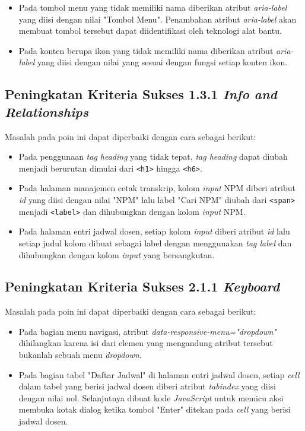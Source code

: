 \begin{itemize}
    \item Pada tombol menu yang tidak memiliki nama diberikan atribut \textit{aria-label} yang diisi dengan nilai "Tombol Menu". Penambahan atribut \textit{aria-label} akan membuat tombol tersebut dapat diidentifikasi oleh teknologi alat bantu.
    \item Pada konten berupa ikon yang tidak memiliki nama diberikan atribut \textit{aria-label} yang diisi dengan nilai yang sesuai dengan fungsi setiap konten ikon.
\end{itemize}

\subsection{Peningkatan Kriteria Sukses 1.3.1 \textit{Info and Relationships}}
\label{subsec:peningkatan_kriteria_sukses_1.3.1}
Masalah pada poin ini dapat diperbaiki dengan cara sebagai berikut:

\begin{itemize}
    \item Pada penggunaan \textit{tag heading} yang tidak tepat, \textit{tag heading} dapat diubah menjadi berurutan dimulai dari \texttt{<h1>} hingga \texttt{<h6>}.
    \item Pada halaman manajemen cetak transkrip, kolom \textit{input} NPM diberi atribut \textit{id} yang diisi dengan nilai "NPM" lalu label "Cari NPM" diubah dari \texttt{<span>} menjadi \texttt{<label>} dan dihubungkan dengan kolom \textit{input} NPM.
    \item Pada halaman entri jadwal dosen, setiap kolom \textit{input} diberi atribut \textit{id} lalu setiap judul kolom dibuat sebagai label dengan menggunakan \textit{tag label} dan dihubungkan dengan kolom \textit{input} yang bersangkutan.
\end{itemize}

\subsection{Peningkatan Kriteria Sukses 2.1.1 \textit{Keyboard}}
\label{subsec:peningkatan_kriteria_sukses_2.1.1}
Masalah pada poin ini dapat diperbaiki dengan cara sebagai berikut:

\begin{itemize}
    \item Pada bagian menu navigasi, atribut \textit{data-responsive-menu="dropdown"} dihilangkan karena isi dari elemen yang mengandung atribut tersebut bukanlah sebuah menu \textit{dropdown}.
    \item Pada bagian tabel "Daftar Jadwal" di halaman entri jadwal dosen, setiap \textit{cell} dalam tabel yang berisi jadwal dosen diberi atribut \textit{tabindex} yang diisi dengan nilai nol. Selanjutnya dibuat kode \textit{JavaScript} untuk memicu aksi membuka kotak dialog ketika tombol "Enter" ditekan pada \textit{cell} yang berisi jadwal dosen.
\end{itemize}

